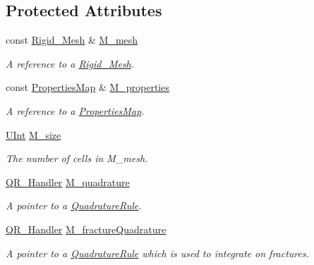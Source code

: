 \subsection*{Protected Attributes}
\begin{DoxyCompactItemize}
\item 
const \hyperlink{classFVCode3D_1_1Rigid__Mesh}{Rigid\+\_\+\+Mesh} \& \hyperlink{classFVCode3D_1_1Quadrature_abaa2519ea32065df30242bd5f5cb2d01}{M\+\_\+mesh}
\begin{DoxyCompactList}\small\item\em A reference to a \hyperlink{classFVCode3D_1_1Rigid__Mesh}{Rigid\+\_\+\+Mesh}. \end{DoxyCompactList}\item 
const \hyperlink{classFVCode3D_1_1PropertiesMap}{Properties\+Map} \& \hyperlink{classFVCode3D_1_1Quadrature_ace6cd23087209d3186ae173c265cde39}{M\+\_\+properties}
\begin{DoxyCompactList}\small\item\em A reference to a \hyperlink{classFVCode3D_1_1PropertiesMap}{Properties\+Map}. \end{DoxyCompactList}\item 
\hyperlink{namespaceFVCode3D_a4bf7e328c75d0fd504050d040ebe9eda}{U\+Int} \hyperlink{classFVCode3D_1_1Quadrature_ae0ab248f031fa026887c4e1fb91a3835}{M\+\_\+size}
\begin{DoxyCompactList}\small\item\em The number of cells in M\+\_\+mesh. \end{DoxyCompactList}\item 
\hyperlink{classFVCode3D_1_1Quadrature_ac1cc519f7f97b5dbb920ffffb24a2130}{Q\+R\+\_\+\+Handler} \hyperlink{classFVCode3D_1_1Quadrature_a9a128b9525429cca80435552ee3b6e56}{M\+\_\+quadrature}
\begin{DoxyCompactList}\small\item\em A pointer to a \hyperlink{classFVCode3D_1_1QuadratureRule}{Quadrature\+Rule}. \end{DoxyCompactList}\item 
\hyperlink{classFVCode3D_1_1Quadrature_ac1cc519f7f97b5dbb920ffffb24a2130}{Q\+R\+\_\+\+Handler} \hyperlink{classFVCode3D_1_1Quadrature_afc75e45ee2a0a8be3cd39f93c2ef0b7e}{M\+\_\+fracture\+Quadrature}
\begin{DoxyCompactList}\small\item\em A pointer to a \hyperlink{classFVCode3D_1_1QuadratureRule}{Quadrature\+Rule} which is used to integrate on fractures. \end{DoxyCompactList}\end{DoxyCompactItemize}
